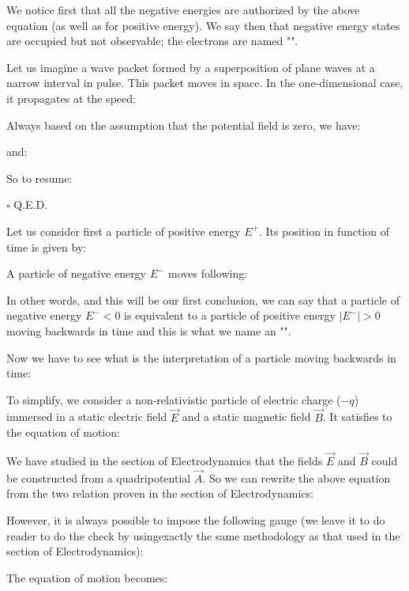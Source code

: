 	We notice first that all the negative energies are authorized by the above equation (as well as for positive energy). We say then that negative energy states are occupied but not observable; the electrons are named "".
	   	\begin{theorem}
	Let us imagine a wave packet formed by a superposition of plane waves at a narrow interval in pulse. This packet moves in space. In the one-dimensional case, it propagates at the speed:
	
	\end{theorem}
	\begin{dem}
	Always based on the assumption that the potential field is zero, we have:
	
	and:
	
	So to resume:
	
	\begin{flushright}
		$\square$  Q.E.D.
	\end{flushright}
	\end{dem}
	Let us consider first a particle of positive energy $E^+$. Its position in function of time is given by:
	
	A particle of negative energy $E^-$ moves following:
	
	In other words, and this will be our first conclusion, we can say that a particle of negative energy $E^-<0$ is equivalent to a particle of positive energy $|E^-|>0$ moving backwards in time and this is what we name an "".
	
	Now we have to see what is the interpretation of a particle moving backwards in time:
	
	To simplify, we consider a non-relativistic particle of electric charge ($-q$) immersed in a static electric field $\vec{E}$ and a static magnetic field $\vec{B}$. It satisfies to the equation of motion:
	
	We have studied in the section of Electrodynamics that the fields $\vec{E}$ and $\vec{B}$ could be constructed from a quadripotential $\vec{A}$. So we can rewrite the above equation from the two relation proven in the section of Electrodynamics:
	
	However, it is always possible to impose the following gauge (we leave it to do reader to do the check by usingexactly the same methodology as that used in the section of Electrodynamics):
	
	The equation of motion becomes:
	
